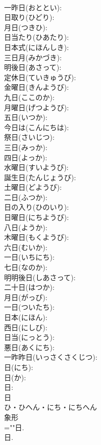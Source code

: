 \documentclass[8pt]{extreport}
\begin{document}
\begin{CJK}{UTF8}{min}
\\	一昨日(おととい): 
\\	日取り(ひどり): 
\\	月日(つきひ): 
\\	日当たり(ひあたり): 
\\	日本式(にほんしき): 
\\	三日月(みかづき): 
\\	明後日(あさって): 
\\	定休日(ていきゅうび): 
\\	金曜日(きんようび): 
\\	九日(ここのか): 
\\	月曜日(げつようび): 
\\	五日(いつか): 
\\	今日は(こんにちは): 
\\	祭日(さいじつ): 
\\	三日(みっか): 
\\	四日(よっか): 
\\	水曜日(すいようび): 
\\	誕生日(たんじょうび): 
\\	土曜日(どようび): 
\\	二日(ふつか): 
\\	日の入り(ひのいり): 
\\	日曜日(にちようび): 
\\	八日(ようか): 
\\	木曜日(もくようび): 
\\	六日(むいか): 
\\	一日(いちにち): 
\\	七日(なのか): 
\\	明明後日(しあさって): 
\\	二十日(はつか): 
\\	月日(がっぴ): 
\\	一日(ついたち): 
\\	日本(にほん): 
\\	西日(にしび): 
\\	日当(にっとう): 
\\	悪日(あくにち): 
\\	一昨昨日(いっさくさくじつ): 
\\	日(にち): 
\\	日(か): 
\\	日: 
\\	日	
\\	ひ・ひへん・にち・にちへん	
\\	象形 
\\	=""日.
\\	日.

\end{CJK}
\end{document}
